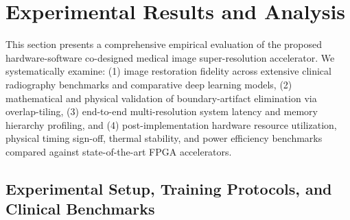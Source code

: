 \documentclass[conference]{IEEEtran}
\begin{document}

\setcounter{section}{3}
\section{Experimental Results and Analysis}
\label{sec:experiments}

\setcounter{subsection}{0}
\setcounter{equation}{20}  %
\setcounter{figure}{6}    %
\setcounter{table}{1}     %

This section presents a comprehensive empirical evaluation of the proposed hardware-software co-designed medical image super-resolution accelerator. We systematically examine: (1) image restoration fidelity across extensive clinical radiography benchmarks and comparative deep learning models, (2) mathematical and physical validation of boundary-artifact elimination via overlap-tiling, (3) end-to-end multi-resolution system latency and memory hierarchy profiling, and (4) post-implementation hardware resource utilization, physical timing sign-off, thermal stability, and power efficiency benchmarks compared against state-of-the-art FPGA accelerators.

\subsection{Experimental Setup, Training Protocols, and Clinical Benchmarks}
\label{sec:exp_setup}
\end{document}
